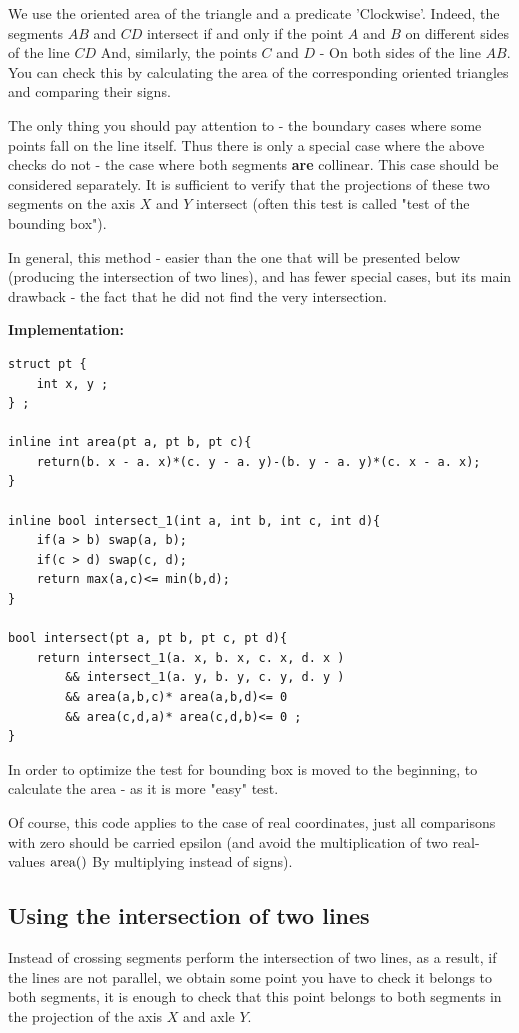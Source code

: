 We use the oriented area of the triangle and a predicate 'Clockwise'. Indeed, the segments $AB$ and $CD$ intersect if and only if the point $A$ and $B$ on different sides of the line $CD$ And, similarly, the points $C$ and $D$ - On both sides of the line $AB$. You can check this by calculating the area of ​​the corresponding oriented triangles and comparing their signs.

The only thing you should pay attention to - the boundary cases where some points fall on the line itself. Thus there is only a special case where the above checks do not - the case where both segments \textbf{are} collinear. This case should be considered separately. It is sufficient to verify that the projections of these two segments on the axis $X$ and $Y$ intersect (often this test is called "test of the bounding box").

In general, this method - easier than the one that will be presented below (producing the intersection of two lines), and has fewer special cases, but its main drawback - the fact that he did not find the very intersection.

\textbf{Implementation:} \begin{verbatim}
struct pt {
    int x, y ;
} ;
 
inline int area(pt a, pt b, pt c){
    return(b. x - a. x)*(c. y - a. y)-(b. y - a. y)*(c. x - a. x);
}
 
inline bool intersect_1(int a, int b, int c, int d){
    if(a > b) swap(a, b);
    if(c > d) swap(c, d);
    return max(a,c)<= min(b,d);
}
 
bool intersect(pt a, pt b, pt c, pt d){
    return intersect_1(a. x, b. x, c. x, d. x )
        && intersect_1(a. y, b. y, c. y, d. y )
        && area(a,b,c)* area(a,b,d)<= 0
        && area(c,d,a)* area(c,d,b)<= 0 ;
} 
\end{verbatim}
In order to optimize the test for bounding box is moved to the beginning, to calculate the area - as it is more "easy" test.

Of course, this code applies to the case of real coordinates, just all comparisons with zero should be carried epsilon (and avoid the multiplication of two real-values $\rm area()$ By multiplying instead of signs).

\subsection{ Using the intersection of two lines }

Instead of crossing segments perform the intersection of two lines, as a result, if the lines are not parallel, we obtain some point you have to check it belongs to both segments, it is enough to check that this point belongs to both segments in the projection of the axis $X$ and axle $Y$.

